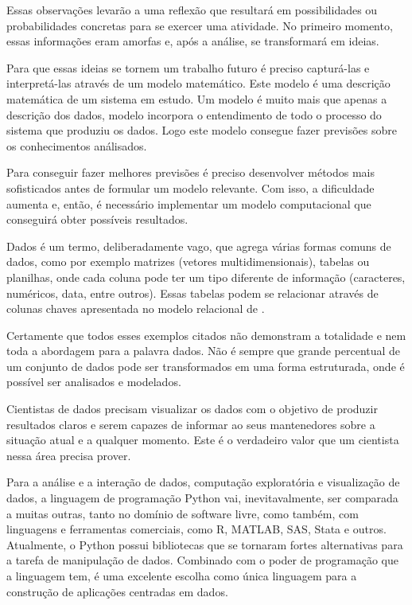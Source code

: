 Essas observações levarão a uma reflexão que resultará em possibilidades ou probabilidades concretas para se exercer uma atividade. No primeiro momento, essas informações eram amorfas e, após a análise, se transformará em ideias.

Para que essas ideias se tornem um trabalho futuro é preciso capturá-las e interpretá-las através de um modelo matemático. Este modelo é uma descrição matemática de um sistema em estudo. Um modelo é muito mais que apenas a descrição dos dados, modelo incorpora o entendimento de todo o processo do sistema que produziu os dados. Logo este modelo consegue fazer previsões sobre os conhecimentos análisados.

Para conseguir fazer melhores previsões é preciso desenvolver métodos mais sofisticados antes de formular um modelo relevante. Com isso, a dificuldade aumenta e, então, é necessário implementar um modelo computacional que conseguirá obter possíveis resultados.

Dados é um termo, deliberadamente vago, que agrega várias formas comuns de dados, como por exemplo matrizes (vetores multidimensionais), tabelas ou planilhas, onde cada coluna pode ter um tipo diferente de informação (caracteres, numéricos, data, entre outros). Essas tabelas podem se relacionar através de colunas chaves apresentada no modelo relacional de .

Certamente que todos esses exemplos citados não demonstram a totalidade e nem toda a abordagem para a palavra dados. Não é sempre que grande percentual de um conjunto de dados pode ser transformados em uma forma estruturada, onde é possível ser analisados e modelados.

Cientistas de dados precisam visualizar os dados com o objetivo de produzir resultados claros e serem capazes de informar ao seus mantenedores sobre a situação atual e a qualquer momento. Este é o verdadeiro valor que um cientista nessa área precisa prover.

Para a análise e a interação de dados, computação exploratória e visualização de dados, a linguagem de programação Python vai, inevitavalmente, ser comparada a muitas outras, tanto no domínio de software livre, como também, com linguagens e ferramentas comerciais, como R, MATLAB, SAS, Stata e outros. Atualmente, o Python possui bibliotecas que se tornaram fortes alternativas para a tarefa de manipulação de dados. Combinado com o poder de programação que a linguagem tem, é uma excelente escolha como única linguagem para a construção de aplicações centradas em dados.

